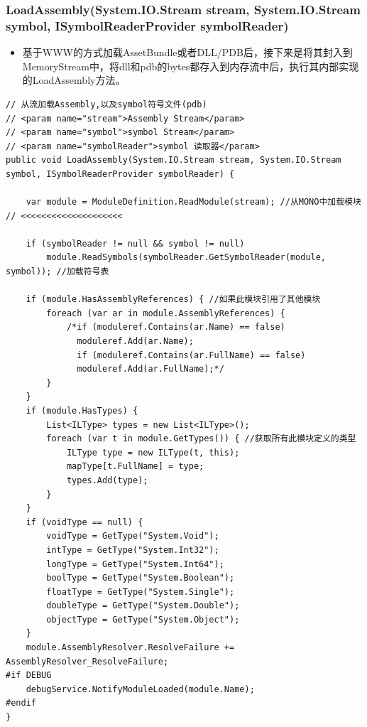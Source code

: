\documentclass[9pt, b5paper]{article}
\begin{document}
\subsubsection{LoadAssembly(System.IO.Stream stream, System.IO.Stream symbol, ISymbolReaderProvider symbolReader)}
\label{sec-10-1-2}
\begin{itemize}
\item 基于WWW的方式加载AssetBundle或者DLL/PDB后，接下来是将其封入到MemoryStream中，将dll和pdb的bytes都存入到内存流中后，执行其内部实现的LoadAssembly方法。
\end{itemize}
\begin{verbatim}
// 从流加载Assembly,以及symbol符号文件(pdb)
// <param name="stream">Assembly Stream</param>
// <param name="symbol">symbol Stream</param>
// <param name="symbolReader">symbol 读取器</param>
public void LoadAssembly(System.IO.Stream stream, System.IO.Stream symbol, ISymbolReaderProvider symbolReader) {

    var module = ModuleDefinition.ReadModule(stream); //从MONO中加载模块 // <<<<<<<<<<<<<<<<<<<< 

    if (symbolReader != null && symbol != null)  
        module.ReadSymbols(symbolReader.GetSymbolReader(module, symbol)); //加载符号表

    if (module.HasAssemblyReferences) { //如果此模块引用了其他模块 
        foreach (var ar in module.AssemblyReferences) {
            /*if (moduleref.Contains(ar.Name) == false)
              moduleref.Add(ar.Name);
              if (moduleref.Contains(ar.FullName) == false)
              moduleref.Add(ar.FullName);*/
        }
    }
    if (module.HasTypes) {
        List<ILType> types = new List<ILType>();
        foreach (var t in module.GetTypes()) { //获取所有此模块定义的类型 
            ILType type = new ILType(t, this);
            mapType[t.FullName] = type;
            types.Add(type);
        }
    }
    if (voidType == null) {
        voidType = GetType("System.Void");
        intType = GetType("System.Int32");
        longType = GetType("System.Int64");
        boolType = GetType("System.Boolean");
        floatType = GetType("System.Single");
        doubleType = GetType("System.Double");
        objectType = GetType("System.Object");
    }
    module.AssemblyResolver.ResolveFailure += AssemblyResolver_ResolveFailure;
#if DEBUG
    debugService.NotifyModuleLoaded(module.Name);
#endif
}
\end{verbatim}
\end{document}

